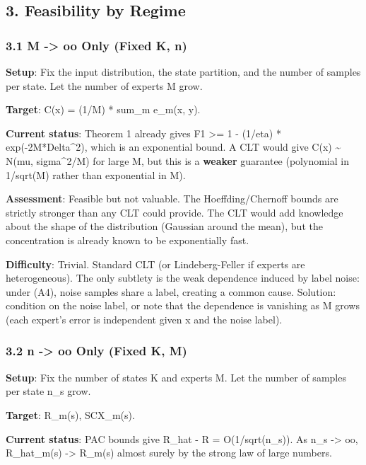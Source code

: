 \documentclass[
  12pt,
]{article}
\begin{document}
\subsection{3. Feasibility by Regime}\label{feasibility-by-regime}

\subsubsection{3.1 M -\textgreater{} oo Only (Fixed K,
n)}\label{m---oo-only-fixed-k-n}

\textbf{Setup}: Fix the input distribution, the state partition, and the
number of samples per state. Let the number of experts M grow.

\textbf{Target}: C(x) = (1/M) * sum\_m e\_m(x, y).

\textbf{Current status}: Theorem 1 already gives F1 \textgreater= 1 -
(1/eta) * exp(-2M*Delta\^{}2), which is an exponential bound. A CLT
would give C(x) \textasciitilde{} N(mu, sigma\^{}2/M) for large M, but
this is a \textbf{weaker} guarantee (polynomial in 1/sqrt(M) rather than
exponential in M).

\textbf{Assessment}: Feasible but not valuable. The Hoeffding/Chernoff
bounds are strictly stronger than any CLT could provide. The CLT would
add knowledge about the shape of the distribution (Gaussian around the
mean), but the concentration is already known to be exponentially fast.

\textbf{Difficulty}: Trivial. Standard CLT (or Lindeberg-Feller if
experts are heterogeneous). The only subtlety is the weak dependence
induced by label noise: under (A4), noise samples share a label,
creating a common cause. Solution: condition on the noise label, or note
that the dependence is vanishing as M grows (each expert's error is
independent given x and the noise label).

\subsubsection{3.2 n -\textgreater{} oo Only (Fixed K,
M)}\label{n---oo-only-fixed-k-m}

\textbf{Setup}: Fix the number of states K and experts M. Let the number
of samples per state n\_s grow.

\textbf{Target}: R\_m(s), SCX\_m(s).

\textbf{Current status}: PAC bounds give \textbar R\_hat - R\textbar{} =
O(1/sqrt(n\_s)). As n\_s -\textgreater{} oo, R\_hat\_m(s)
-\textgreater{} R\_m(s) almost surely by the strong law of large
numbers.
\end{document}
